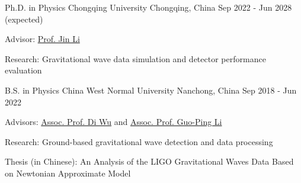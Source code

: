 

\begin{cventries}

  \cventry
    {Ph.D. in Physics} %
    {Chongqing University} %
    {Chongqing, China}%
    {Sep 2022 - Jun 2028 (expected)} %
    {
      \begin{cvitems} %
        \item{Advisor: \href{https://inspirehep.net/authors/1456898?ui-citation-summary=true&ui-exclude-self-citations=true}{Prof. Jin Li}}
        \item{Research: Gravitational wave data simulation and detector performance evaluation}
      \end{cvitems}
    }

  \cventry
    {B.S. in Physics} %
    {China West Normal University} %
    {Nanchong, China}%
    {Sep 2018 - Jun 2022} %
    {
      \begin{cvitems} %
        \item{Advisors: \href{https://inspirehep.net/authors/1647692?ui-citation-summary=true&ui-exclude-self-citations=true}{Assoc. Prof. Di Wu} and \href{https://inspirehep.net/authors/1275221?ui-citation-summary=true&ui-exclude-self-citations=true}{Assoc. Prof. Guo-Ping Li}}
        \item{Research: Ground-based gravitational wave detection and data processing}
        \item{Thesis (in Chinese): An Analysis of the LIGO Gravitational Waves Data Based on Newtonian Approximate Model}
      \end{cvitems}
    }

\end{cventries}
